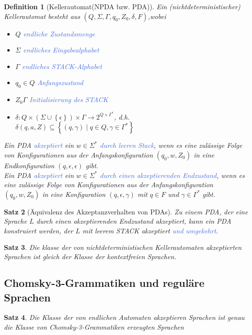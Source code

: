 \documentclass[11pt]{article}
\newcommand{\tcol}[1]{\textcolor{RoyalBlue}{#1}}
\newcommand{\set}[1]{\left\lbrace #1\right\rbrace}
\theoremstyle{break}
\newtheorem{satz}{Satz}[section]
\newtheorem{defi}[satz]{Definition}
\begin{document}
\begin{defi}[Kellerautomat(NPDA bzw. PDA)]
Ein (nichtdeterministischer) Kellerautomat besteht aus $(Q,\Sigma,\Gamma,q_0,Z_0,\delta,F)$,wobei
\begin{itemize}
\item $Q$ \tcol{endliche Zustandsmenge}
\item $\Sigma$ \tcol{endliches Eingabealphabet}
\item $\Gamma$ \tcol{endliches STACK-Alphabet}
\item $q_0\in Q$ \tcol{Anfangszustand}
\item $Z_0\Gamma$ \tcol{Initialisierung des STACK}
\item $\delta\colon Q\times(\Sigma\cup\set{\epsilon})\times\Gamma\to 2^{Q\times\Gamma^*}$, d.h. $\delta(q,a,Z)\subseteq\set{(q,\gamma)\mid q\in Q,\gamma\in\Gamma^*}$
\end{itemize}
Ein PDA \tcol{akzeptiert} ein $w\in\Sigma^*$ \tcol{durch leeren Stack}, wenn es eine zulässige Folge von Konfigurationen aus der Anfangskonfiguration $(q_0,w,Z_0)$ in eine Endkonfiguration $(q,\epsilon,\epsilon)$ gibt.\\ 
Ein PDA \tcol{akzeptiert} ein $w\in\Sigma^*$ \tcol{durch einen akzeptierenden Endzustand}, wenn es eine zulässige Folge von Konfigurationen aus der Anfangskonfiguration $(q_0,w,Z_0)$ in eine Konfiguration $(q,\epsilon,\gamma)$ mit $q\in F$ und $\gamma\in\Gamma^*$ gibt.
\end{defi}

\begin{satz}[Äquivalenz des Akzeptanzverhalten von PDAs]
Zu einem PDA, der eine Sprache $L$ durch einen akzeptierenden Endzustand akzeptiert, kann ein PDA konstruiert werden, der $L$ mit leerem STACK akzeptiert \tcol{und umgekehrt}.
\end{satz}

\begin{satz}
Die klasse der von nichtdeterministischen Kellerautomaten akzeptierten Sprachen ist gleich der Klasse der kontextfreien Sprachen.
\end{satz}


\subsection{Chomsky-3-Grammatiken und reguläre Sprachen}

\begin{satz}
Die Klasse der von endlichen Automaten akzeptieren Sprachen ist genau die Klasse von Chomsky-3-Grammatiken erzeugten Sprachen
\end{satz}
\end{document}
